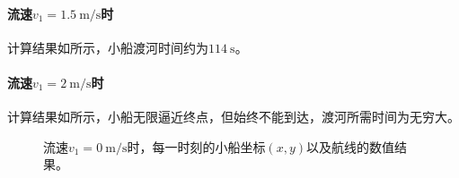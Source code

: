 \documentclass[12pt,a4paper]{article}
\begin{document}
\paragraph{流速$v_1=1.5\ \mathrm{m/s}$时} 计算结果如所示，小船渡河时间约为$114\ \mathrm{s}$。

\paragraph{流速$v_1=2\ \mathrm{m/s}$时} 计算结果如所示，小船无限逼近终点，但始终不能到达，渡河所需时间为无穷大。

\begin{figure}
    \centering
    \caption{流速$v_1=0\ \mathrm{m/s}$时，每一时刻的小船坐标$(x,y)$以及航线的数值结果。}
    \label{fig:ex6_v1_0}
\end{figure}
\end{document}
